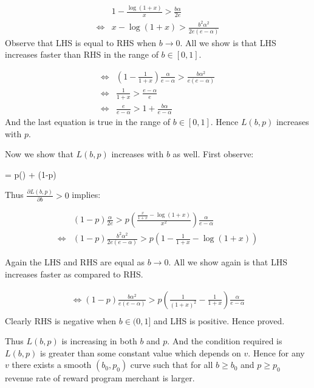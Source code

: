 \begin{align*}
& 1-\frac{\log(1+x)}{x} > \frac{b\alpha}{2e}\\
\Leftrightarrow & x - \log(1+x) > \frac{b^2\alpha^2}{2e(e-\alpha)}
\end{align*}
Observe that LHS is equal to RHS when $b\rightarrow 0$. 
All we show is that LHS increases faster than RHS in the range of $b\in [0,1]$. 

\begin{align*}
\Leftrightarrow & \left(1 - \frac{1}{1+x}\right) \frac{\alpha}{e-\alpha} > \frac{b\alpha^2}{e(e-\alpha)}\\
\Leftrightarrow & \frac{1}{1+x} > \frac{e-\alpha}{e}\\
\Leftrightarrow & \frac{e}{e-\alpha} > 1 + \frac{b\alpha}{e-\alpha}
\end{align*}
And the last equation is true in the range of $b\in [0,1]$. Hence $L(b,p)$ increases with $p$.

Now we show that $L(b,p)$ increases with $b$ as well. First observe:

\beq
{} = p\left(\right) + (1-p)
\notag
\eeq

Thus $\frac{\partial L(b,p)}{\partial b} > 0$ implies:

\begin{align*}
& (1-p)\frac{\alpha}{2e} > p\left(\frac{\frac{x}{1+x} - \log(1+x)}{x^2}\right)\frac{\alpha}{e-\alpha}\\
\Leftrightarrow & (1-p)\frac{b^2\alpha^2}{2e(e-\alpha)} > p \left(1 - \frac{1}{1+x} - \log(1+x)\right)
\end{align*}

Again the LHS and RHS are equal as $b\rightarrow 0$. All we show again is that LHS increases faster as compared to RHS.

\begin{align*}
\Leftrightarrow (1-p)\frac{b\alpha^2}{e(e-\alpha)} > p\left(\frac{1}{(1+x)^2} - \frac{1}{1+x} \right)\frac{\alpha}{e-\alpha}\\
\end{align*}
Clearly RHS is negative when $b\in (0,1]$ and LHS is positive. Hence proved.

Thus $L(b,p)$ is increasing in both $b$ and $p$. And the condition required is $L(b,p)$ is greater than some constant value which depends on $v$.
Hence for any $v$ there exists a smooth $(b_0,p_0)$ curve such that for all $b\ge b_0$ and $p\ge p_0$ revenue rate of reward program merchant is larger.

\endproof

